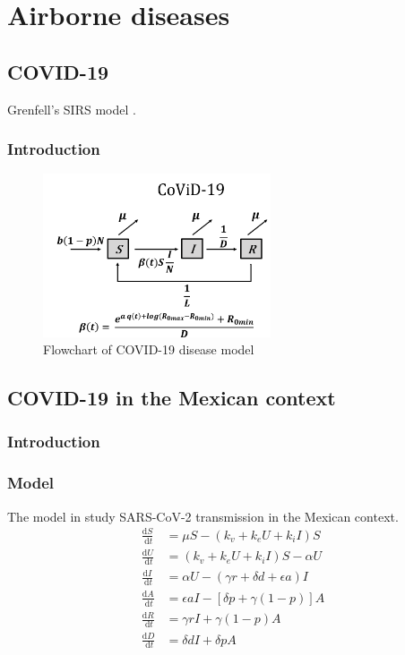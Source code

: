 \documentclass{book}
\begin{document}


\chapter{Airborne diseases}
\label{chapt:airborne}

\section{COVID-19}
Grenfell's SIRS model \cite{baker2020susceptible}.
\subsection*{Introduction}
\begin{figure}[H]
    \centering
    \includegraphics[width = 0.6\textwidth]{Flowcharts/covid.png}
    \caption{Flowchart of COVID-19 disease model}
    \label{fig:covid19_flow}
\end{figure}


\section{COVID-19 in the Mexican context}
\subsection{Introduction}
\subsection{Model}
The model in \cite{santamaria2020possible} study SARS-CoV-2 transmission in the Mexican context.
\begin{align}
\frac{\mathrm{d} S}{\mathrm{~d} t}&=\mu S-\left(k_{v}+k_{e} U+k_{i} I\right) S \\
\frac{\mathrm{d} U}{\mathrm{~d} t}&=\left(k_{v}+k_{e} U+k_{i} I\right) S-\alpha U \\
\frac{\mathrm{d} I}{\mathrm{~d} t}&=\alpha U-(\gamma r+\delta d+\epsilon a) I \\
\frac{\mathrm{d} A}{\mathrm{~d} t}&=\epsilon a I-[\delta p+\gamma(1-p)] A \\
\frac{\mathrm{d} R}{\mathrm{~d} t}&=\gamma r I+\gamma(1-p) A \\
\frac{\mathrm{d} D}{\mathrm{~d} t}&=\delta d I+\delta p A
\end{align}
\end{document}
